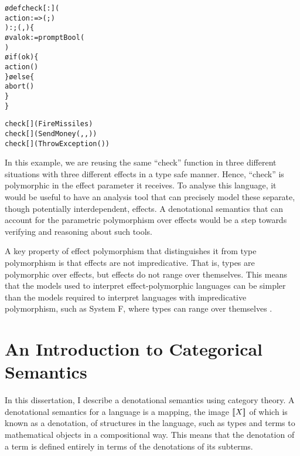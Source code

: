 \begin{framed}
    \begin{framed}
        \begin{alltt}
\o{def} check[{}: ](
    action:  => (; )
): ; (, ) \{
    \o{val} ok:  = promptBool(
    )
    \o{if} (ok) \{
        action()
    \} \o{else} \{
       abort()
    \}
\}  
            \end{alltt}
    \end{framed}

    \begin{framed}
        \begin{alltt}
check[](FireMissiles)
check[](SendMoney(, , ))
check[](ThrowException())
        \end{alltt}
    \end{framed}
\end{framed}

In this example, we are reusing the same “check” function in three different situations with three different effects in a type safe manner. Hence, “check” is polymorphic in the effect parameter it receives. To analyse this language, it would be useful to have an analysis tool that can precisely model these separate, though potentially interdependent, effects. A denotational semantics that can account for the parametric polymorphism over effects would be a step towards verifying and reasoning about such tools. 

A key property of effect polymorphism that distinguishes it from type polymorphism is that effects are not impredicative. That is, types are polymorphic over effects, but effects do not range over themselves. This means that the models used to interpret effect-polymorphic languages can be simpler than the models required to interpret languages with impredicative polymorphism, such as System F, where types can range over themselves \cite{PolymorphismIsNotSetTheoretic}. 


\section{An Introduction to Categorical Semantics}

In this dissertation, I describe a denotational semantics using category theory. A denotational semantics for a language is a mapping, the image ${\bf [\![}X{\bf ]\!]}$ of which is known as a denotation, of structures in the language, such as types and terms to mathematical objects in a compositional way. This means that the denotation of a term is defined entirely in terms of the denotations of its subterms.

